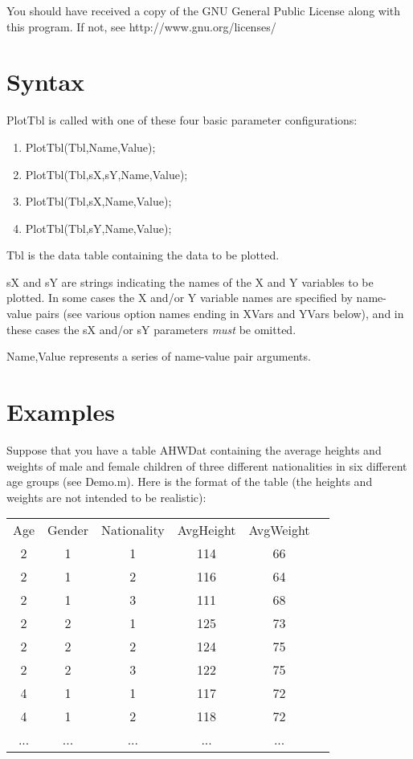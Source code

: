 \documentclass{article}
\begin{document}
You should have received a copy of the GNU General Public License
along with this program.  If not, see http://www.gnu.org/licenses/ 

\section{Syntax}

PlotTbl is called with one of these four basic parameter configurations:
\begin{enumerate}
\item PlotTbl(Tbl,Name,Value);
\item PlotTbl(Tbl,sX,sY,Name,Value);
\item PlotTbl(Tbl,sX,Name,Value);
\item PlotTbl(Tbl,sY,Name,Value);
\end{enumerate}

Tbl is the data table containing the data to be plotted.

sX and sY are strings indicating the names of the X and Y variables to be plotted.
In some cases the X and/or Y variable names are specified by name-value pairs (see various
option names ending in XVars
and YVars below), and in these cases the sX and/or sY parameters \emph{must} be omitted.

Name,Value represents a series of name-value pair arguments.

\section{Examples}

Suppose that you have a table AHWDat containing the average heights and weights of male
and female children of three different nationalities in six different age groups (see Demo.m).
Here is the format of the table (the heights and weights are not intended to be realistic):

\begin{tabular}{cccccc}
Age & Gender & Nationality & AvgHeight & AvgWeight \\
  2 &    1   &       1     &    114    &   66  \\
  2 &    1   &       2     &    116    &   64  \\
  2 &    1   &       3     &    111    &   68  \\
  2 &    2   &       1     &    125    &   73  \\
  2 &    2   &       2     &    124    &   75  \\
  2 &    2   &       3     &    122    &   75  \\
  4 &    1   &       1     &    117    &   72  \\
  4 &    1   &       2     &    118    &   72  \\
... &    ... &      ...    &    ...    &  ...  \\
\end{tabular}
\end{document}
